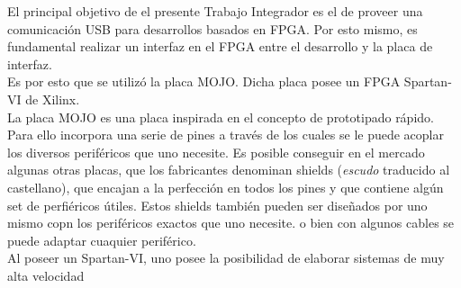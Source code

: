 El principal objetivo de el presente Trabajo Integrador es el de proveer una comunicación USB para desarrollos basados en FPGA. Por esto mismo, es fundamental realizar un interfaz en el FPGA entre el desarrollo y la placa de interfaz.\\

Es por esto que se utilizó la placa MOJO. Dicha placa posee un FPGA Spartan-VI de Xilinx.\\

La placa MOJO es una placa inspirada en el concepto de prototipado rápido. Para ello incorpora una serie de pines a través de los cuales se le puede acoplar los diversos periféricos que uno necesite. Es posible conseguir en el mercado algunas otras placas, que los fabricantes denominan shields ({\it escudo} traducido al castellano), que encajan a la perfección en todos los pines y que contiene algún set de perfiéricos útiles. Estos shields también pueden ser diseñados por uno mismo copn los periféricos exactos que uno necesite. o bien con algunos cables se puede adaptar cuaquier periférico.\\

Al poseer un Spartan-VI, uno posee la posibilidad de elaborar sistemas de muy alta velocidad